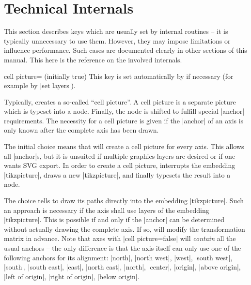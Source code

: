
\section[reference.technicalinternals]{Technical Internals}

{

This section describes keys which are usually set by internal routines -- it is
typically unnecessary to use them. However, they may impose limitations or
influence performance. Such cases are documented clearly in other sections of
this manual. This here is the reference on the involved internals.

\begin{pgfplotskey}{cell picture= (initially true)}
    This key is set automatically by \PGFPlots{} if necessary (for example by
    |set layers|).

    Typically, \PGFPlots{} creates a so-called ``cell picture''. A cell picture
    is a separate picture which is typeset into a node. Finally, the node is
    shifted to fulfill special |anchor| requirements. The necessity for a cell
    picture is given if the |anchor| of an axis is only known after the
    complete axis has been drawn.

    The initial choice  means that \PGFPlots{} will create a
    cell picture for every axis. This allows all |anchor|s, but it is unsuited
    if multiple graphics layers are desired or if one wants SVG export. In
    order to create a cell picture, \PGFPlots{} interrupts the embedding
    |tikzpicture|, draws a new |tikzpicture|, and finally typesets the result
    into a node.

    The choice  tells \PGFPlots{} to draw its paths directly
    into the embedding |tikzpicture|. Such an approach is necessary if the axis
    shall use layers of the embedding |tikzpicture|. This is possible if and
    only if the |anchor| can be determined without actually drawing the
    complete axis. If so, \PGFPlots{} will modify the transformation matrix in
    advance. Note that axes with |cell picture=false| will \emph{contain} all
    the usual anchors -- the only difference is that the axis itself can only
    use one of the following anchors for its alignment: |north|, |north west|,
    |west|, |south west|, |south|, |south east|, |east|, |north east|, |north|,
    |center|, |origin|, |above origin|, |left of origin|, |right of origin|,
    |below origin|.


\end{pgfplotskey}}
